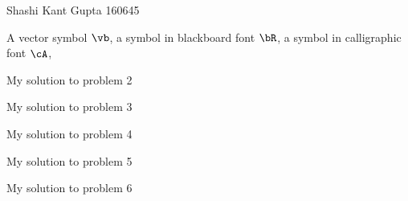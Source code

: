 \documentclass[a4paper,11pt]{article}
\begin{document}
{Shashi Kant Gupta}   %
{160645}	%

\begin{mlsolution}

A vector symbol $\vb$, a symbol in blackboard font $\bR$, a symbol in calligraphic font $\cA$,   


\end{mlsolution}

\begin{mlsolution}

My solution to problem 2


\end{mlsolution}

\begin{mlsolution}

My solution to problem 3

\end{mlsolution}

\begin{mlsolution}

My solution to problem 4

\end{mlsolution}

\begin{mlsolution}

My solution to problem 5

\end{mlsolution}

\begin{mlsolution}

My solution to problem 6

\end{mlsolution}
\end{document}

